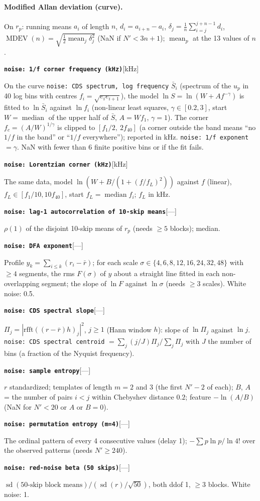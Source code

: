 \documentclass[10pt]{article}
\newcommand{\code}[1]{\texttt{#1}}
\newcommand{\feat}[2]{\par\medskip\noindent\textbf{\texttt{#1}}\hfill{\small [#2]}\par\nopagebreak\smallskip}
\newcommand{\med}{\operatorname*{median}}
\newcommand{\mean}{\operatorname*{mean}}
\newcommand{\std}{\operatorname{sd}}
\begin{document}
\paragraph{Modified Allan deviation (curve).} On $r_p$: running means $a_i$ of length $n$, $d_i = a_{i+n} - a_i$,
$\delta_j = \tfrac1n\sum_{i=j}^{j+n-1} d_i$, $\operatorname{MDEV}(n) = \sqrt{\tfrac12\mean_j\delta_j^2}$ (NaN if $N' < 3n+1$);
$\mean_p$ at the 13 values of $n$.
\feat{noise: 1/f corner frequency (kHz)}{kHz}
On the curve \code{noise: CDS spectrum, log frequency} $\bar S_i$ (spectrum of the $u_p$ in 40 log bins with centres
$f_i = \sqrt{e_ie_{i+1}}$), the model $\ln S = \ln(W + A f^{-\gamma})$ is fitted to $\ln \bar S_i$ against $\ln f_i$ (non-linear least squares,
$\gamma \in [0.2, 3]$, start $W = \med$ of the upper half of $\bar S$, $A = W f_1$, $\gamma = 1$). The corner
$f_c = (A/W)^{1/\gamma}$ is clipped to $[f_1/2,\ 2f_{40}]$ (a corner outside the band means ``no $1/f$ in the band'' or ``$1/f$ everywhere'');
reported in kHz. \code{noise: 1/f exponent} $= \gamma$. NaN with fewer than 6 finite positive bins or if the fit fails.
\feat{noise: Lorentzian corner (kHz)}{kHz}
The same data, model $\ln(W + B/(1 + (f/f_L)^2))$ against $f$ (linear), $f_L \in [f_1/10, 10f_{40}]$, start $f_L = \med f_i$;
$f_L$ in kHz.
\feat{noise: lag-1 autocorrelation of 10-skip means}{---}
$\rho(1)$ of the disjoint 10-skip means of $r_p$ (needs $\ge 5$ blocks); median.
\feat{noise: DFA exponent}{---}
Profile $y_k = \sum_{i\le k}(r_i - \bar r)$; for each scale $\sigma \in \{4,6,8,12,16,24,32,48\}$ with $\ge 4$ segments, the rms $F(\sigma)$ of
$y$ about a straight line fitted in each non-overlapping segment; the slope of $\ln F$ against $\ln\sigma$ (needs $\ge 3$ scales). White
noise: 0.5.
\feat{noise: CDS spectral slope}{---}
$\Pi_j = |\mathrm{rfft}((r - \bar r)h)_j|^2$, $j \ge 1$ (Hann window $h$): slope of $\ln\Pi_j$ against $\ln j$.
\code{noise: CDS spectral centroid} $= \sum_j (j/J)\Pi_j/\sum_j\Pi_j$ with $J$ the number of bins (a fraction of the Nyquist frequency).
\feat{noise: sample entropy}{---}
$r$ standardized; templates of length $m = 2$ and $3$ (the first $N'-2$ of each); $B$, $A$ = the number of pairs $i<j$ within Chebyshev
distance $0.2$; feature $-\ln(A/B)$ (NaN for $N' < 20$ or $A$ or $B = 0$).
\feat{noise: permutation entropy (m=4)}{---}
The ordinal pattern of every 4 consecutive values (delay 1); $-\sum p\ln p/\ln 4!$ over the observed patterns (needs $N' \ge 240$).
\feat{noise: red-noise beta (50 skips)}{---}
$\std(\text{50-skip block means})/(\std(r)/\sqrt{50})$, both ddof 1, $\ge 3$ blocks. White noise: 1.
\end{document}
